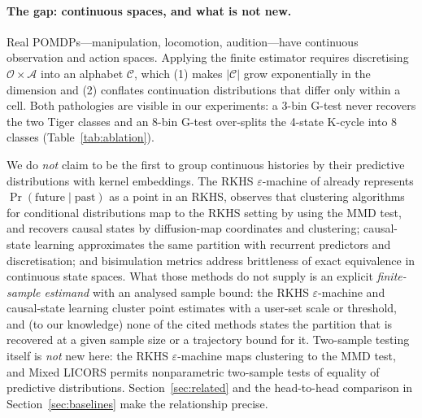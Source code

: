 \documentclass[10pt]{article}
\newcommand{\calO}{\mathcal{O}}
\newcommand{\calA}{\mathcal{A}}
\newcommand{\calC}{\mathcal{C}}
\begin{document}
\paragraph{The gap: continuous spaces, and what is not new.}
Real POMDPs---manipulation, locomotion, audition---have continuous observation
and action spaces.  Applying the finite estimator requires discretising
$\calO\times\calA$ into an alphabet $\calC$, which (1) makes $|\calC|$ grow
exponentially in the dimension and (2) conflates continuation distributions
that differ only within a cell.  Both pathologies are visible in our
experiments: a 3-bin G-test never recovers the two Tiger classes and an 8-bin
G-test over-splits the 4-state K-cycle into 8 classes (Table~\ref{tab:ablation}).

We do \emph{not} claim to be the first to group continuous histories by their
predictive distributions with kernel embeddings.  The RKHS $\varepsilon$-machine
of \citet{Brodu2022} already represents $\Pr(\text{future}\mid\text{past})$ as a
point in an RKHS, observes that clustering algorithms for conditional
distributions map to the RKHS setting by using the MMD test, and recovers causal
states by diffusion-map coordinates and clustering; causal-state learning
\citep{Zhang2019causal} approximates the same partition with recurrent
predictors and discretisation; and bisimulation metrics \citep{Ferns2011}
address brittleness of exact equivalence in continuous state spaces.  What
those methods do not supply is an explicit \emph{finite-sample estimand} with an
analysed sample bound: the RKHS $\varepsilon$-machine and causal-state
learning cluster point estimates with a user-set scale or threshold, and
(to our knowledge) none of the cited methods states the partition that is
recovered at a given sample size or a trajectory bound for it.  Two-sample
testing itself is \emph{not} new here: the RKHS $\varepsilon$-machine maps
clustering to the MMD test, and Mixed LICORS \citep{Goerg2013} permits
nonparametric two-sample tests of equality of predictive distributions.  Section~\ref{sec:related}
and the head-to-head comparison in Section~\ref{sec:baselines} make the
relationship precise.
\end{document}
